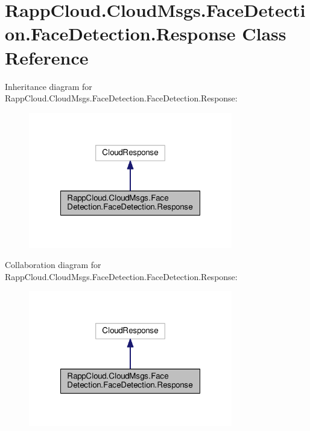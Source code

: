 \hypertarget{classRappCloud_1_1CloudMsgs_1_1FaceDetection_1_1FaceDetection_1_1Response}{\section{Rapp\-Cloud.\-Cloud\-Msgs.\-Face\-Detection.\-Face\-Detection.\-Response Class Reference}
\label{classRappCloud_1_1CloudMsgs_1_1FaceDetection_1_1FaceDetection_1_1Response}
}


Inheritance diagram for Rapp\-Cloud.\-Cloud\-Msgs.\-Face\-Detection.\-Face\-Detection.\-Response\-:
\nopagebreak
\begin{figure}[H]
\begin{center}
\leavevmode
\includegraphics[width=252pt]{classRappCloud_1_1CloudMsgs_1_1FaceDetection_1_1FaceDetection_1_1Response__inherit__graph}
\end{center}
\end{figure}


Collaboration diagram for Rapp\-Cloud.\-Cloud\-Msgs.\-Face\-Detection.\-Face\-Detection.\-Response\-:
\nopagebreak
\begin{figure}[H]
\begin{center}
\leavevmode
\includegraphics[width=252pt]{classRappCloud_1_1CloudMsgs_1_1FaceDetection_1_1FaceDetection_1_1Response__coll__graph}
\end{center}
\end{figure}
